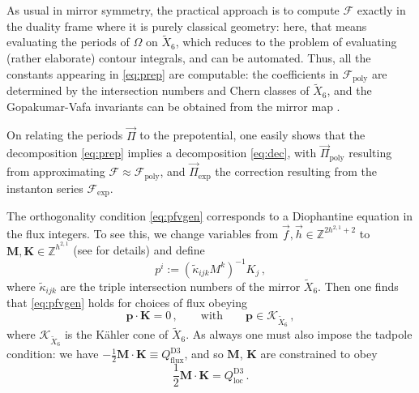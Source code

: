 \documentclass[12pt,a4wide]{article}
\begin{document}
As usual in mirror symmetry, the practical approach is to compute $\mathcal{F}$ exactly in the duality frame where it is purely classical geometry: here, that means evaluating the periods of $\Omega$ on $\widetilde{X}_6$, which reduces to the problem of evaluating (rather elaborate) contour integrals, and can be automated.  Thus, all the constants appearing in \eqref{eq:prep} are computable: the coefficients in $\mathcal{F}_{\text{poly}}$ are determined by the intersection numbers and Chern classes of $\widetilde{X}_6$, and the Gopakumar-Vafa invariants can be obtained from the mirror map \cite{Demirtas:2023als}.

On relating the periods $\vec{\Pi}$ to the prepotential, one easily shows that the decomposition \eqref{eq:prep} implies a decomposition \eqref{eq:dec}, with 
$\vec{\Pi}_{\text{poly}}$ resulting from approximating $\mathcal{F} \approx \mathcal{F}_{\text{poly}}$, and $\vec{\Pi}_{\text{exp}}$ the correction resulting from the instanton series $\mathcal{F}_{\text{exp}}$.

The orthogonality condition \eqref{eq:pfvgen} corresponds to a Diophantine equation in the flux integers.  To see this, we change variables from $\vec{f},\vec{h} \in \mathbb{Z}^{2h^{2,1}+2}$ to $\mathbf{M},\mathbf{K} \in \mathbb{Z}^{h^{2,1}}$ 
(see \cite{Demirtas:2021nlu} for details)
and define
\begin{equation}
p^i := (\tilde{\kappa}_{ijk} M^k)^{-1} K_j\,,
\end{equation} where $\tilde{\kappa}_{ijk}$ are the triple intersection numbers of the mirror $\widetilde{X}_6$.
Then one finds that \eqref{eq:pfvgen} holds for choices of flux obeying
\begin{equation}\label{eq:pfpk}
    \mathbf{p}\cdot \mathbf{K} = 0\,, \qquad \text{with} \qquad \mathbf{p} \in \mathcal{K}_{\widetilde{X}_6}\,,
\end{equation}
where $\mathcal{K}_{\widetilde{X}_6}$ is the K\"ahler cone of $\widetilde{X}_6$.
As always one must also impose the tadpole condition:
we have $-\frac{1}{2} \mathbf{M}\cdot\mathbf{K} \equiv Q^{\text{D3}}_{\text{flux}}$, 
and so $\mathbf{M}$, $\mathbf{K}$ are constrained to obey
\begin{equation}\label{eq:mktad}
\frac{1}{2} \mathbf{M}\cdot\mathbf{K} = Q^{\text{D3}}_{\text{loc}}  \,.
\end{equation}
  
\end{document}
